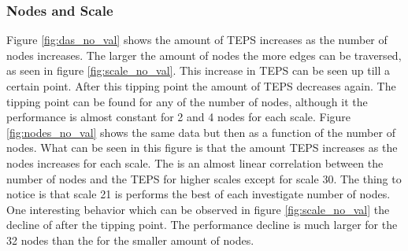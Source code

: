 \subsubsection{Nodes and Scale}
\label{res:nodes_scale}
Figure \ref{fig:das_no_val} shows the amount of TEPS increases as the number of nodes increases. The larger the amount of nodes the more edges can be traversed, as seen in figure \ref{fig:scale_no_val}. This increase in TEPS can be seen up till a certain point. After this tipping point the amount of TEPS decreases again. The tipping point can be found for any of the number of nodes, although it the performance is almost constant for 2 and 4 nodes for each scale.
Figure \ref{fig:nodes_no_val} shows the same data but then as a function of the number of nodes. What can be seen in this figure is that the amount TEPS increases as the nodes increases for each scale. The is an almost linear correlation between the number of nodes and the TEPS for higher scales except for scale 30. The thing to notice is that scale 21 is performs the best of each investigate number of nodes.
One interesting behavior which can be observed in figure \ref{fig:scale_no_val} the decline of after the tipping point. The performance decline is much larger for the 32 nodes than the for the smaller amount of nodes.   

